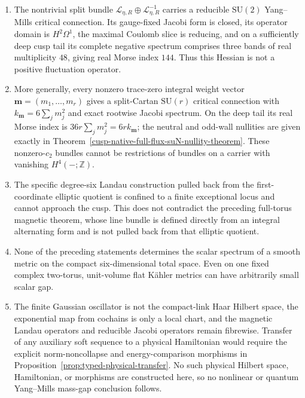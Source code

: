 \documentclass[11pt]{article}
\numberwithin{equation}{section}
\theoremstyle{definition}
\theoremstyle{remark}
\begin{document}
\begin{enumerate}[leftmargin=2.3em]
forms over $(R_1,\infty)$ with Lebesgue measure, are self-adjoint and satisfy
\[
 \sigma=\sigma_{\mathrm{ess}}=\sigma_{\mathrm c}=[0,\infty),
 \qquad \sigma_{\mathrm p}=\varnothing,
 \qquad \ker=\{0\}.
\]
The parameter $R$ is not differentiated.
\item The nontrivial split bundle
$\mathscr L_{\eta,R}\oplus\mathscr L_{\eta,R}^{-1}$ carries a reducible
$\mathrm{SU}(2)$ Yang--Mills critical connection.  Its gauge-fixed Jacobi
form is closed, its operator domain is $H^2\Omega^1$, the maximal Coulomb
slice is reducing, and on a sufficiently deep cusp tail its complete
negative spectrum comprises three bands of real multiplicity $48$, giving
real Morse index $144$.  Thus this Hessian is not a positive fluctuation
operator.
\item More generally, every nonzero trace-zero integral weight vector
$\mathbf m=(m_1,\ldots,m_r)$ gives a split-Cartan $\mathrm{SU}(r)$ critical
connection with $k_{\mathbf m}=6\sum_jm_j^2$ and exact rootwise Jacobi
spectrum.  On the deep tail its real Morse index is
$36r\sum_jm_j^2=6rk_{\mathbf m}$; the neutral and odd-wall nullities are
given exactly in Theorem~\ref{cusp-native-full-flux-suN-nullity-theorem}.
These nonzero-$c_2$ bundles cannot be restrictions of bundles on a carrier
with vanishing $H^4(-;\mathbb Z)$.
\item The specific degree-six Landau construction pulled back from the
first-coordinate elliptic quotient is confined to a finite exceptional locus
and cannot approach the cusp.  This does not contradict the preceding
full-torus magnetic theorem, whose line bundle is defined directly from an
integral alternating form and is not pulled back from that elliptic quotient.
\item None of the preceding statements determines the scalar spectrum of a
smooth metric on the compact six-dimensional total space.  Even on one fixed
complex two-torus, unit-volume flat Kähler metrics can have arbitrarily small
scalar gap.
\item The finite Gaussian oscillator is not the compact-link Haar Hilbert
space, the exponential map from cochains is only a local chart, and the
magnetic Landau operators and reducible Jacobi operators remain fibrewise.
Transfer of any auxiliary soft sequence to a physical Hamiltonian would
require the explicit norm-noncollapse and energy-comparison morphisms in
Proposition~\ref{prop:typed-physical-transfer}.  No such physical Hilbert
space, Hamiltonian, or morphisms are constructed here, so no nonlinear or
quantum Yang--Mills mass-gap conclusion follows.
\end{enumerate}
\end{document}
